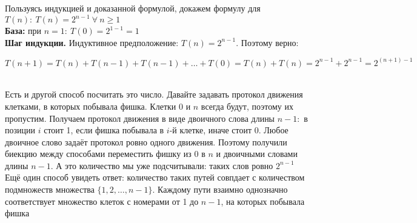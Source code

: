 \documentclass[a4paper]{article}
\begin{document}
Пользуясь индукцией и доказанной формулой, докажем формулу для $T(n):\ T(n)=2^{n-1}\ \forall\ n\geqslant1$\\[2mm]
 \textbf{База:} при $n=1:\ T(0)=2^{1-1}=1$\\[2mm]
 \textbf{Шаг индукции.} Индуктивное предположение: $T(n)=2^{n-1}$. Поэтому верно:\\[2mm]
\centerline{$T(n+1)=T(n)+T(n-1)+T(n-1)+\ldots+T(0)=T(n)+T(n)=2^{n-1}+2^{n-1}=2^{(n+1)-1}$}\\[2mm]
 Есть и другой способ посчитать это число. Давайте задавать протокол движения клетками, в которых побывала фишка. Клетки 0 и $n$ всегда будут, поэтому их пропустим. Получаем протокол движения в виде двоичного слова длины $n-1:$ в позиции $i$ стоит 1, если фишка побывала в $i$-й клетке, иначе стоит 0. Любое двоичное слово задаёт протокол ровно одного движения. Поэтому получили биекцию между способами переместить фишку из 0 в $n$ и двоичными словами длины $n-1$. А это количество мы уже подсчитывали: таких слов ровно $2^{n-1}$\\[2mm]
 Ещё один способ увидеть ответ: количество таких путей совпдает с количеством подмножеств множества $\{1, 2,\ldots, n-1\}$. Каждому пути взаимно однозначно соответствует множество клеток с номерами от 1 до $n-1$, на которых побывала
фишка
\end{document}
